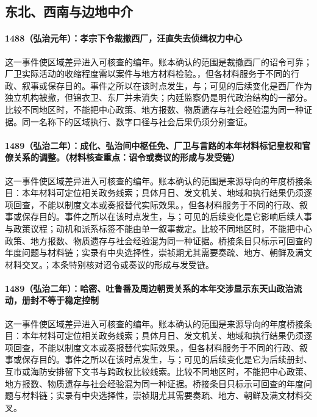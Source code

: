 \subsection{东北、西南与边地中介}

\paragraph{1488（弘治元年）：孝宗下令裁撤西厂，汪直失去侦缉权力中心} 这一事件使区域差异进入可核查的编年。账本确认的范围是裁撤西厂的诏令可靠；厂卫实际活动的收缩程度需以案件与地方材料检验。，但各材料服务于不同的行政、叙事或保存目的。事件之所以在该时点发生，与；可见的后续变化是西厂作为独立机构被撤，但锦衣卫、东厂并未消失；内廷监察仍是明代政治结构的一部分。比较不同地区时，不能把中心政策、地方报数、物质遗存与社会经验混为同一种证据。同一名称下的区域执行、数字口径与社会后果仍须分别查证。

\paragraph{1489（弘治二年）：成化、弘治间中枢任免、厂卫与言路的本年材料标记皇权和官僚关系的调整。（材料核查重点：诏令或奏议的形成与发受链）} 这一事件使区域差异进入可核查的编年。账本确认的范围是来源导向的年度桥接条目：本年材料可定位相关政务线索；具体月日、发文机关、地域和执行结果仍须逐项回查，不能以制度文本或奏报替代实际效果。，但各材料服务于不同的行政、叙事或保存目的。事件之所以在该时点发生，与；可见的后续变化是它影响后续人事与政策议程；动机和派系标签不能由单一叙事裁定。比较不同地区时，不能把中心政策、地方报数、物质遗存与社会经验混为同一种证据。桥接条目只标示可回查的年度问题与材料链；实录有中央选择性，崇祯期尤其需要奏疏、地方、朝鲜及满文材料交叉。；本条特别核对诏令或奏议的形成与发受链。

\paragraph{1489（弘治二年）：哈密、吐鲁番及周边朝贡关系的本年交涉显示东天山政治流动，册封不等于稳定控制} 这一事件使区域差异进入可核查的编年。账本确认的范围是来源导向的年度桥接条目：本年材料可定位相关政务线索；具体月日、发文机关、地域和执行结果仍须逐项回查，不能以制度文本或奏报替代实际效果。，但各材料服务于不同的行政、叙事或保存目的。事件之所以在该时点发生，与；可见的后续变化是它为后续册封、互市或海防安排留下文书与跨政权比较线索。比较不同地区时，不能把中心政策、地方报数、物质遗存与社会经验混为同一种证据。桥接条目只标示可回查的年度问题与材料链；实录有中央选择性，崇祯期尤其需要奏疏、地方、朝鲜及满文材料交叉。

